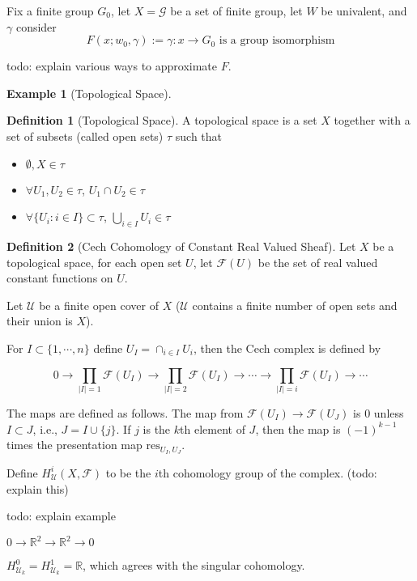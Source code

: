 \documentclass[11pt, oneside]{article}   	%
\theoremstyle{definition}
\newtheorem*{defn}{Definition}
\newtheorem*{eg}{Example}
\begin{document}
Fix a finite group $G_0$, let $X=\mathcal{G}$ be a set of finite group, let $W$ be univalent, and $\gamma$ consider
\begin{equation}
	F(x; w_0, \gamma) := \gamma: x \to G_0\text{ is a group isomorphism}
\end{equation}

todo: explain various ways to approximate $F$.

\begin{eg}
	[Topological Space]

	\begin{defn}[Topological Space]
		A topological space is a set $X$ together with a set of subsets (called open sets) $\tau$ such that
		\begin{itemize}
			\item $\emptyset, X\in \tau$
			\item $\forall U_1, U_2\in \tau$, $U_1\cap U_2\in \tau$
			\item $\forall \{U_i:i\in I\}\subset \tau$, $\bigcup_{i\in I}U_i\in \tau$
		\end{itemize}
	\end{defn}

	\begin{defn}[Cech Cohomology of Constant Real Valued Sheaf]
		Let $X$ be a topological space, for each open set $U$, let $\mathscr{F}(U)$ be the set of real valued constant functions on $U$.

		Let $\mathcal{U}$ be a finite open cover of $X$ ($\mathcal{U}$ contains a finite number of open sets and their union is $X$).

		For $I\subset \{1,\cdots,n\}$ define $U_I=\cap_{i\in I} U_i$, then the Cech complex is defined by

		\begin{equation}
			0\to \prod_{|I|=1} \mathscr{F}(U_I)\to
			\prod_{|I|=2} \mathscr{F}(U_I)\to
			\cdots \to 
			\prod_{|I|=i} \mathscr{F}(U_I)\to\cdots
		\end{equation}
	\end{defn}

	The maps are defined as follows. The map from $\mathscr{F}(U_I)\to \mathscr{F}(U_J)$ is 0 unless $I\subset J$, i.e., $J=I\cup \{j\}$. If $j$ is the $k$th element of $J$, then the map is $(-1)^{k-1}$ times the presentation map $\text{res}_{U_I,U_J}$.

	Define $H^i_{\mathcal{U}}(X, \mathscr{F})$ to be the $i$th cohomology group of the complex. (todo: explain this)

	todo: explain example

	$0\to \mathbb{R}^2\to \mathbb{R}^2\to 0$

	$H^0_{\mathcal{U}_k}=H^1_{\mathcal{U}_k}=\mathbb{R}$, which agrees with the singular cohomology.
\end{eg}
\end{document}
